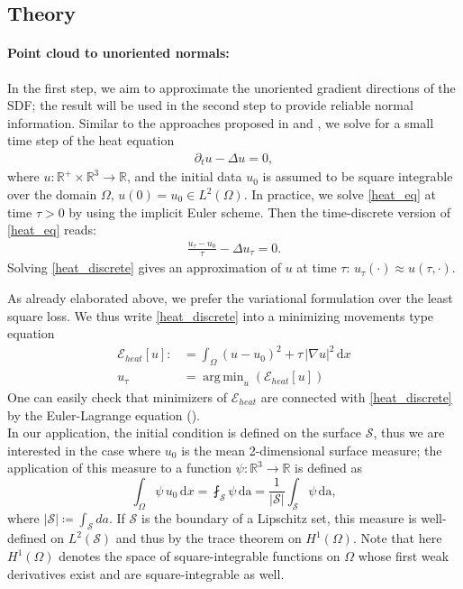 \documentclass[12pt,openany]{book}
\newcommand{\R}{\mathbb{R}}
\def\S{\mathcal{S}}
\theoremstyle{plainnormal}
\theoremstyle{remark}
\DeclareMathOperator*{\argmin}{arg\,min}
\begin{document}
\subsection{Theory}
\paragraph{Point cloud to unoriented normals:}
In the first step, we aim to approximate the unoriented gradient directions of the SDF; the result will be used in the second step to provide reliable normal information. Similar to the approaches proposed in \cite{Crane_2013} and \cite{FengCrane}, we solve for a small time step of the heat equation 
\begin{align}
\partial_t u - \Delta u = 0 \label{heat_eq},
\end{align} where $u: \R^+ \times \R^3 \rightarrow \R$, and the initial data $u_0$ is assumed to be square integrable over the domain $\Omega$, $u(0) = u_0 \in L^2(\Omega)$. In practice, we solve \cref{heat_eq} at time $\tau > 0$ by using the implicit Euler scheme. Then the time-discrete version of \cref{heat_eq} reads: 
\begin{align}\label{heat_discrete}
    \frac{u_\tau - u_0}{\tau} - \Delta u_\tau = 0.
\end{align}
Solving \cref{heat_discrete} gives an approximation of $u$ at time $\tau$: $u_\tau(\cdot) \approx u(\tau,\cdot)$.\par
As already elaborated above, we prefer the variational formulation over the least square loss. We thus write \cref{heat_discrete} into a minimizing movements type equation
\begin{align}\label{loss_heat}
    \mathcal{E}_{heat}[u] :&= \int_\Omega (u - u_0)^2 + \tau\, |\nabla u|^2 \,\mathrm{d}x \\
    u_\tau &= \argmin_u (\mathcal{E}_{heat}[u])
\end{align}
One can easily check that minimizers of $\mathcal{E}_{heat}$ are connected with \cref{heat_discrete} by the Euler-Lagrange equation (). \\
In our application, the initial condition is defined on the surface $\S$, thus we are interested in the case where $u_0$ is the mean 2-dimensional surface measure; the application of this measure to a function $\psi: \R^3 \rightarrow\R$ is defined as$$\int_\Omega \psi \,u_0 \,\mathrm{d}x =\fint_\S \psi\,\mathrm{da} = \frac{1}{|\mathcal{S}|} \int_\mathcal{S} \psi \,\mathrm{da},$$
where $|\mathcal{S}| \coloneqq \int_\S da$.
If $\S$ is the boundary of a Lipschitz set, this measure is well-defined on $L^2(\S)$ and thus by the trace theorem on $H^1(\Omega)$. Note that here $H^1(\Omega)$ denotes the space of square-integrable functions on $\Omega$ whose first weak derivatives exist and are square-integrable as well. 
\end{document}
